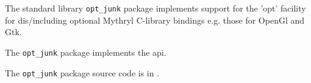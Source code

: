 
The standard library {\tt opt\_junk} package implements support for the 'opt' facility for dis/including optional Mythryl C-library bindings e.g. those for OpenGl and Gtk.

The {\tt opt\_junk} package implements the  api.

The {\tt opt\_junk} package source code is in .



